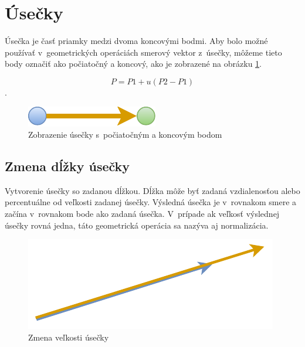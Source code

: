 \section{Úsečky}
Úsečka je časť priamky medzi dvoma koncovými bodmi. Aby bolo možné používať v~geometrických operáciách smerový vektor z~úsečky, môžeme tieto body označiť ako počiatočný a koncový, ako je zobrazené na obrázku \ref{fig:Navrh operacii-1D - Line}. 

\begin{equation}
    P = P1 + u(P2-P1)
    \label{eq:priamka}
\end{equation}. 

\begin{figure}[H]
	\centering
	\includegraphics[]{obrazky-figures/Diagram/Draw/2Line/DP Navrh operacii-1D - Line.pdf}
	\caption{Zobrazenie úsečky s~počiatočným a koncovým bodom}
	\label{fig:Navrh operacii-1D - Line}
\end{figure}


\subsection*{Zmena dĺžky úsečky}
Vytvorenie úsečky so zadanou dĺžkou. Dĺžka môže byť zadaná vzdialenosťou alebo percentuálne od veľkosti zadanej úsečky. Výsledná úsečka je v~rovnakom smere a začína v~rovnakom bode ako zadaná úsečka. V~prípade ak veľkosť výslednej úsečky rovná jedna, táto geometrická operácia sa nazýva aj normalizácia.  


\begin{figure}[H]
	\centering
	\includegraphics[]{obrazky-figures/Diagram/Draw/2Line/DP Navrh operacii-1D - LineChangeLength.pdf}
	\caption{Zmena veľkosti úsečky}
	\label{fig:LineChangeLength}
\end{figure}

